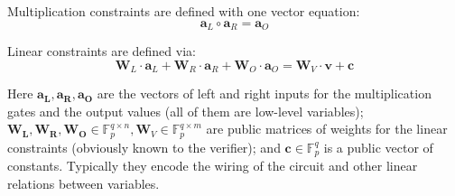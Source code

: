 \documentclass[../../book.tex]{subfiles}
\begin{document}
Multiplication constraints are defined with one vector equation:
$$ \mathbf{a}_L \circ \mathbf{a}_R = \mathbf{a}_O $$

Linear constraints are defined via:
$$ \mathbf{W}_L \cdot \mathbf{a}_L + \mathbf{W}_R \cdot \mathbf{a}_R + \mathbf{W}_O \cdot \mathbf{a}_O = \mathbf{W}_V \cdot \mathbf{v} + \mathbf{c} $$

Here $\mathbf{a_L, a_R, a_O}$ are the vectors of left and right inputs for the multiplication gates and the output values (all of them are low-level variables); $\mathbf{W_L, W_R, W_O} \in \mathbb{F}_p^{q \times n}, \mathbf{W}_V \in \mathbb{F}_p^{q \times m}$ are public matrices of weights for the linear constraints (obviously known to the verifier); and $\mathbf{c} \in \mathbb{F}_p^q$ is a public vector of constants. Typically they encode the wiring of the circuit and other linear relations between variables.
\end{document}
